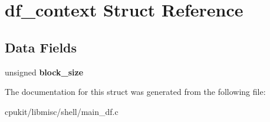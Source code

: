 \hypertarget{structdf__context}{}\section{df\+\_\+context Struct Reference}
\label{structdf__context}
\subsection*{Data Fields}
\begin{DoxyCompactItemize}
\item 
\mbox{\label{structdf__context_a5a5d52357aa48b50d00bdc61b370946e}} 
unsigned {\bfseries block\+\_\+size}
\end{DoxyCompactItemize}


The documentation for this struct was generated from the following file\+:\begin{DoxyCompactItemize}
\item 
cpukit/libmisc/shell/main\+\_\+df.\+c\end{DoxyCompactItemize}
